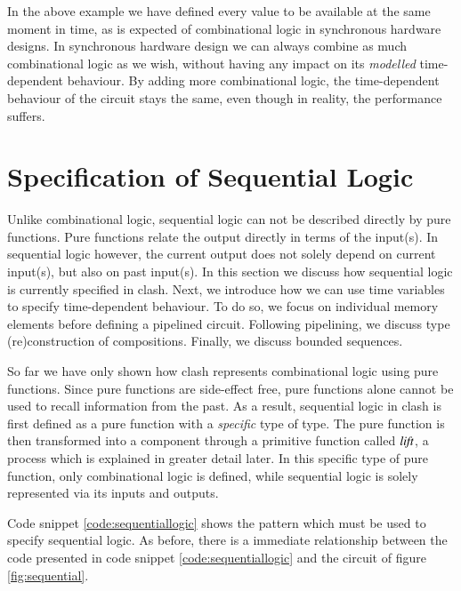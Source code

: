 In the above example we have defined every value to be available at the same moment in time, as is expected of combinational logic in synchronous hardware designs.
In synchronous hardware design we can always combine as much combinational logic as we wish, without having any impact on its \textit{modelled} time-dependent behaviour.
By adding more combinational logic, the time-dependent behaviour of the circuit stays the same, even though in reality, the performance suffers.

%
%
\section{Specification of Sequential Logic}
Unlike combinational logic, sequential logic can not be described directly by pure functions.
Pure functions relate the output directly in terms of the input(s).
In sequential logic however, the current output does not solely depend on current input(s), but also on past input(s).
In this section we discuss how sequential logic is currently specified in \gls{clash}.
Next, we introduce how we can use time variables to specify time-dependent behaviour.
To do so, we focus on individual memory elements before defining a pipelined circuit.
Following pipelining, we discuss type (re)construction of compositions.
Finally, we discuss bounded sequences.

So far we have only shown how \gls{clash} represents combinational logic using pure functions.
Since pure functions are side-effect free, pure functions alone cannot be used to recall information from the past.
As a result, sequential logic in \gls{clash} is first defined as a pure function with a \textit{specific} type of type.
The pure function is then transformed into a component through a primitive function called \ensuremath{\Varid{lift}}, a process which is explained in greater detail later.
In this specific type of pure function, only combinational logic is defined, while sequential logic is solely represented via its inputs and outputs.

Code snippet \ref{code:sequentiallogic} shows the pattern which must be used to specify sequential logic.
As before, there is a immediate relationship between the code presented in code snippet \ref{code:sequentiallogic} and the circuit of figure \ref{fig:sequential}.

